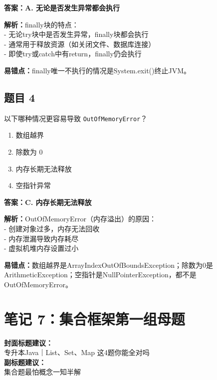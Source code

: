 \documentclass[12pt,a4paper]{ctexart}
\begin{document}
\begin{answerbox}
	\textbf{答案：A. 无论是否发生异常都会执行}

	\textbf{解析：}finally块的特点：\\
	- 无论try块中是否发生异常，finally块都会执行\\
	- 通常用于释放资源（如关闭文件、数据库连接）\\
	- 即使try或catch中有return，finally仍会执行

	\textbf{易错点：}finally唯一不执行的情况是System.exit()终止JVM。
\end{answerbox}

\subsection*{题目 4}
以下哪种情况更容易导致 \texttt{OutOfMemoryError}？
\begin{enumerate}[label=\Alph*.]
	\item 数组越界
	\item 除数为 0
	\item 内存长期无法释放
	\item 空指针异常
\end{enumerate}

\begin{answerbox}
	\textbf{答案：C. 内存长期无法释放}

	\textbf{解析：}OutOfMemoryError（内存溢出）的原因：\\
	- 创建对象过多，内存无法回收\\
	- 内存泄漏导致内存耗尽\\
	- 虚拟机堆内存设置过小

	\textbf{易错点：}数组越界是ArrayIndexOutOfBoundsException；除数为0是ArithmeticException；空指针是NullPointerException，都不是OutOfMemoryError。
\end{answerbox}

\newpage

\section{笔记 7：集合框架第一组母题}
\begin{coverbox}
	\textbf{封面标题建议：}\\
	专升本Java｜List、Set、Map 这4题你能全对吗\\
	\textbf{副标题建议：}\\
	集合题最怕概念一知半解
\end{coverbox}
\end{document}
